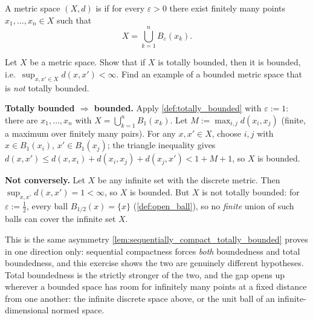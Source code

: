 \begin{definition}
\label{def:totally_bounded}
A metric space $(X,d)$ is   if for
every $\varepsilon > 0$ there exist finitely many points $x_1,\dots,x_n \in X$ such that
\[X = \bigcup_{k=1}^{n} B_\varepsilon(x_k).\]
\end{definition}

\begin{exercise}
\label{ex:totally_bounded_implies_bounded}
Let $X$ be a metric space. Show that if $X$ is totally bounded, then it is bounded, i.e.\
$\sup_{x,x'\in X}d(x,x') < \infty$. Find an example of a bounded metric space that is
\emph{not} totally bounded.
\end{exercise}

\begin{exercisesolution}
\textbf{Totally bounded $\Rightarrow$ bounded.} Apply \cref{def:totally_bounded} with
$\varepsilon := 1$: there are $x_1,\dots,x_n$ with $X = \bigcup_{k=1}^n B_1(x_k)$. Let
$M := \max_{i,j}d(x_i,x_j)$ (finite, a maximum over finitely many pairs). For any
$x,x' \in X$, choose $i,j$ with $x \in B_1(x_i)$, $x' \in B_1(x_j)$; the triangle inequality
gives $d(x,x') \leq d(x,x_i)+d(x_i,x_j)+d(x_j,x') < 1+M+1$, so $X$ is bounded.

\textbf{Not conversely.} Let $X$ be any infinite set with the discrete metric. Then
$\sup_{x,x'}d(x,x') = 1 < \infty$, so $X$ is bounded. But $X$ is not totally bounded: for
$\varepsilon := \tfrac12$, every ball $B_{1/2}(x) = \{x\}$ (\cref{def:open_ball}), so no
\emph{finite} union of such balls can cover the infinite set $X$.
\end{exercisesolution}

\begin{remark}
This is the same asymmetry \cref{lem:sequentially_compact_totally_bounded} proves in one
direction only: sequential compactness forces \emph{both} boundedness and total boundedness, and
this exercise shows the two are genuinely different hypotheses. Total boundedness is the strictly
stronger of the two, and the gap opens up wherever a bounded space has room for infinitely many
points at a fixed distance from one another: the infinite discrete space above, or the unit ball
of an infinite-dimensional normed space.
\end{remark}

